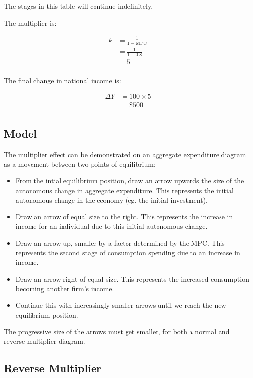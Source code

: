 \documentclass[a4paper,11pt]{report}
\begin{document}
The stages in this table will continue indefinitely.

The multiplier is:

$$
\begin{aligned}
k & = \frac{1}{1 - \mbox{MPC}} \\
& = \frac{1}{1 - 0.8} \\
& = 5 \\
\end{aligned}
$$

The final change in national income is:

$$
\begin{aligned}
\Delta Y & = 100 \times 5 \\
& = \$500 \\
\end{aligned}
$$

\subsection{Model}


The multiplier effect can be demonstrated on an aggregate expenditure diagram
as a movement between two points of equilibrium:

\begin{itemize}
\item From the intial equilibrium position, draw an arrow upwards the size of
	the autonomous change in aggregate expenditure. This represents the initial
	autonomous change in the economy (eg. the initial investment).
\item Draw an arrow of equal size to the right. This represents the increase in
	income for an individual due to this initial autonomous change.
\item Draw an arrow up, smaller by a factor determined by the MPC. This
	represents the second stage of consumption spending due to an increase in
	income.
\item Draw an arrow right of equal size. This represents the increased
	consumption becoming another firm's income.
\item Continue this with increasingly smaller arrows until we reach the new
	equilibrium position.
\end{itemize}

The progressive size of the arrows must get smaller, for both a normal and
reverse multiplier diagram.

\subsection{Reverse Multiplier}
\end{document}
